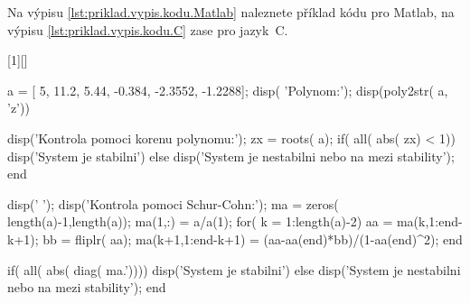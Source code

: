 Na výpisu \ref{lst:priklad.vypis.kodu.Matlab} naleznete příklad kódu pro Matlab, na výpisu \ref{lst:priklad.vypis.kodu.C} zase pro jazyk~C.

[1][]{%
%
%
\lstset{language=Matlab,numbers=left,#1}%
}{%
%
%
}

\begin{matlab}[frame=single,float=htbp,caption={Příklad Schur-Cohnova testu stability v~prostředí Matlab.},label=lst:priklad.vypis.kodu.Matlab,numberstyle=\scriptsize, numbersep=7pt]

a = [ 5, 11.2, 5.44, -0.384, -2.3552, -1.2288];
disp( 'Polynom:'); disp(poly2str( a, 'z'))

disp('Kontrola pomoci korenu polynomu:');
zx = roots( a);
if( all( abs( zx) < 1))
    disp('System je stabilni')
else
    disp('System je nestabilni nebo na mezi stability');
end

disp(' '); disp('Kontrola pomoci Schur-Cohn:');
ma = zeros( length(a)-1,length(a));
ma(1,:) = a/a(1);
for( k = 1:length(a)-2)
    aa = ma(k,1:end-k+1);
    bb = fliplr( aa);
    ma(k+1,1:end-k+1) = (aa-aa(end)*bb)/(1-aa(end)^2);
end

if( all( abs( diag( ma.'))))
    disp('System je stabilni')
else
    disp('System je nestabilni nebo na mezi stability');
end
\end{matlab}

